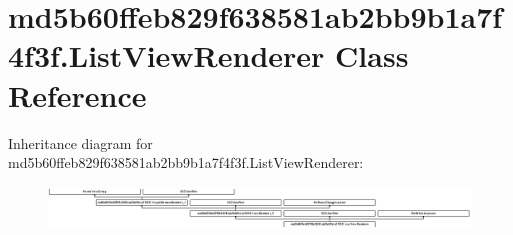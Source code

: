 \hypertarget{classmd5b60ffeb829f638581ab2bb9b1a7f4f3f_1_1ListViewRenderer}{}\section{md5b60ffeb829f638581ab2bb9b1a7f4f3f.\+List\+View\+Renderer Class Reference}
\label{classmd5b60ffeb829f638581ab2bb9b1a7f4f3f_1_1ListViewRenderer}
Inheritance diagram for md5b60ffeb829f638581ab2bb9b1a7f4f3f.\+List\+View\+Renderer\+:\begin{figure}[H]
\begin{center}
\leavevmode
\includegraphics[height=1.122807cm]{classmd5b60ffeb829f638581ab2bb9b1a7f4f3f_1_1ListViewRenderer}
\end{center}
\end{figure}
